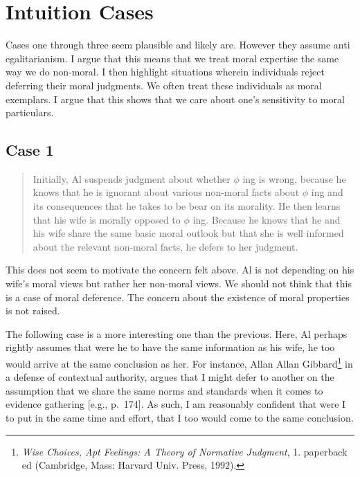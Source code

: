 \documentclass[phdthesis,12pt,final]{wuthesis}
\theoremstyle{definition}
\theoremstyle{definition}
\theoremstyle{definition}
\theoremstyle{definition}
\theoremstyle{remark}
\begin{document}
\section{Intuition Cases}\label{intuition-cases}

Cases one through three seem plausible and likely are. However they assume anti egalitarianism. I argue that this means that we treat moral expertise the same way we do non-moral. I then highlight situations wherein individuals reject deferring their moral judgments. We often treat these individuals as moral exemplars. I argue that this shows that we care about one's sensitivity to moral particulars.

\subsection*{Case 1}\label{case-1}

\begin{quote}
Initially, Al suspends judgment about whether \(\phi\) ing is wrong, because he knows that he is ignorant about various non-moral facts about \(\phi\) ing and its consequences that he takes to be bear on its morality. He then learns that his wife is morally opposed to \(\phi\) ing. Because he knows that he and his wife share the same basic moral outlook but that she is well informed about the relevant non-moral facts, he defers to her judgment.
\end{quote}

This does not seem to motivate the concern felt above. Al is not depending on his wife's moral views but rather her non-moral views. We should not think that this is a case of moral deference. The concern about the existence of moral properties is not raised.

The following case is a more interesting one than the previous. Here, Al perhaps rightly assumes that were he to have the same information as his wife, he too would arrive at the same conclusion as her. For instance, Allan Allan Gibbard\footnote{\emph{Wise Choices, Apt Feelings: A Theory of Normative Judgment}, 1. paperback ed (Cambridge, Mass: Harvard Univ. Press, 1992).} in a defense of contextual authority, argues that I might defer to another on the assumption that we share the same norms and standards when it comes to evidence gathering {[}e.g., p.~174{]}. As such, I am reasonably confident that were I to put in the same time and effort, that I too would come to the same conclusion.
\end{document}
